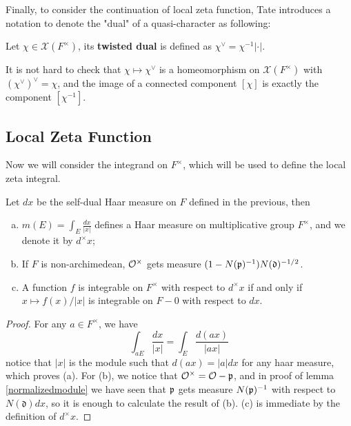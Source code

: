 Finally, to consider the continuation of local zeta function, Tate introduces a notation to denote the "dual" of a quasi-character as following:

\begin{definition}
    Let \(\chi \in \mathcal{X}(F^\times)\), its \textbf{twisted dual} is defined as \(\chi^\vee = \chi^{-1}|\cdot|\).
\end{definition}

It is not hard to check that \(\chi \mapsto \chi^\vee\) is a homeomorphism on \(\mathcal{X}(F^\times)\) with \((\chi^\vee)^\vee = \chi\), and the image of a connected component \([\chi]\) is exactly the component \([\chi^{-1}]\).














\subsection{Local Zeta Function}
 Now we will consider the integrand on \(F^\times\), which will be used to define the local zeta integral.

\begin{lemma} \label{local-multiplicative-haarmeasure}
    Let \(dx\) be the self-dual Haar measure on \(F\) defined in the previous, then 
    \begin{enumerate} [(a)]
        \item \(m(E) = \int_{E}\frac{dx}{|x|}\) defines a Haar measure on multiplicative group \(F^\times\), and we denote it by \(d^\times x\);
        
        \item If \(F\) is non-archimedean, \(\mathcal{O}^\times \) gets measure \((1-N(\mathfrak{p})^{-1})N(\mathfrak{d})^{-1/2}\).
        \item A function \(f\) is integrable on \(F^\times\) with respect to \(d^\times x\) if and only if \(x \mapsto f(x)/|x|\) is integrable on \(F-{0}\) with respect to \(dx\). 
    \end{enumerate}
\end{lemma}
\begin{proof}
    For any \(a \in F^\times\), we have 
    \[\int_{aE}\frac{dx}{|x|} = \int_{E} \frac{d(ax)}{|ax|}\]
    notice that \(|x|\) is the module such that \(d(ax) = |a|dx\) for any haar measure, which proves (a). For (b), we notice that \(\mathcal{O}^\times  = \mathcal{O} - \mathfrak{p}\), and in proof of lemma \ref{normalizedmodule} we have seen that \(\mathfrak{p}\) gets measure \(N(\mathfrak{p})^{-1}\) with respect to \(N(\mathfrak{d})dx\), so it is enough to calculate the result of (b). (c) is immediate by the definition of \(d^\times x\).
\end{proof}


